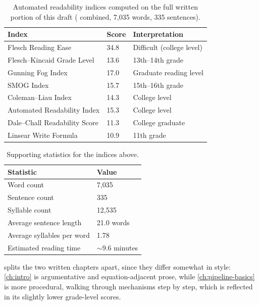 \documentclass[12pt,a4paper]{report}
\begin{document}
\begin{table}[htbp]
\centering
\caption{Automated readability indices computed on the full written
portion of this draft ( combined,
7{,}035 words, 335 sentences).}
\label{tab:readability}
\begin{tabular}{@{}L{0.55\textwidth}L{0.15\textwidth}L{0.2\textwidth}@{}}
\toprule
\textbf{Index} & \textbf{Score} & \textbf{Interpretation} \\
\midrule
Flesch Reading Ease & 34.8 & Difficult (college level) \\
Flesch--Kincaid Grade Level & 13.6 & 13th--14th grade \\
Gunning Fog Index & 17.0 & Graduate reading level \\
SMOG Index & 15.7 & 15th--16th grade \\
Coleman--Liau Index & 14.3 & College level \\
Automated Readability Index & 15.3 & College level \\
Dale--Chall Readability Score & 11.3 & College graduate \\
Linsear Write Formula & 10.9 & 11th grade \\
\bottomrule
\end{tabular}
\end{table}

\begin{table}[htbp]
\centering
\caption{Supporting statistics for the indices above.}
\label{tab:readability-stats}
\begin{tabular}{@{}L{0.55\textwidth}L{0.35\textwidth}@{}}
\toprule
\textbf{Statistic} & \textbf{Value} \\
\midrule
Word count & 7{,}035 \\
Sentence count & 335 \\
Syllable count & 12{,}535 \\
Average sentence length & 21.0 words \\
Average syllables per word & 1.78 \\
Estimated reading time & $\sim$9.6 minutes \\
\bottomrule
\end{tabular}
\end{table}

 splits the two written chapters apart,
since they differ somewhat in style: \cref{ch:intro} is argumentative
and equation-adjacent prose, while \cref{ch:pipeline-basics} is more
procedural, walking through mechanisms step by step, which is reflected
in its slightly lower grade-level scores.
\end{document}

